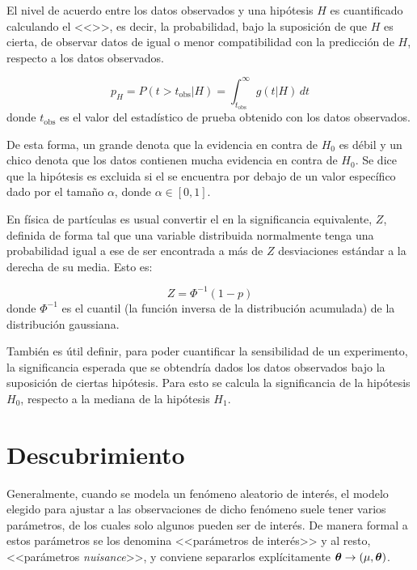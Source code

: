 El nivel de acuerdo entre los datos observados y una hipótesis $H$ es
cuantificado calculando el <<\pvalue>>, es decir, la probabilidad, bajo la
suposición de que $H$ es cierta, de observar datos de igual o menor
compatibilidad con la predicción de $H$, respecto a los datos observados.

\begin{equation}
  p_H = P(t>t_\text{obs}|H) = \int_{t_\text{obs}}^{\infty} g(t|H) \, dt
\end{equation}
%
donde $t_\text{obs}$ es el valor del estadístico de prueba obtenido con los
datos observados.

De esta forma, un {\pvalue} grande denota que la evidencia en contra de $H_0$ es
débil y un {\pvalue} chico denota que los datos contienen mucha evidencia en
contra de $H_0$.
Se dice que la hipótesis es excluida si el {\pvalue} se encuentra por debajo de un valor
específico dado por el tama\~no $\alpha$, donde $\alpha \in [0,1]$.

En física de partículas es usual convertir el {\pvalue} en la significancia
equivalente, $Z$, definida de forma tal que una variable distribuida normalmente
tenga una probabilidad igual a ese {\pvalue} de ser encontrada a más de $Z$
desviaciones estándar a la derecha de su media. Esto es:

\begin{equation}
  Z = \Phi^{-1}(1-p)
\end{equation}
%
donde $\Phi^{-1}$ es el cuantil (la función inversa de la distribución
acumulada) de la distribución gaussiana.

También es útil definir, para poder cuantificar la sensibilidad de un experimento,
la significancia esperada que se obtendría dados los datos observados bajo la
suposición de ciertas hipótesis.
Para esto se calcula la significancia de la hipótesis $H_0$, respecto
a la mediana de la hipótesis $H_1$.


\section{Descubrimiento}

Generalmente, cuando se modela un fenómeno aleatorio de interés, el modelo
elegido para ajustar a las observaciones de dicho fenómeno suele tener varios
parámetros, de los cuales solo algunos pueden ser de interés. De manera formal a
estos parámetros se los denomina <<parámetros de interés>> y al resto, <<parámetros
\emph{nuisance}>>, y conviene separarlos explícitamente $\bm{\theta} \rightarrow (\mu, \bm{\theta})$.

